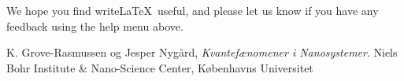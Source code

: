 \documentclass[a4paper]{article}
\begin{document}
We hope you find write\LaTeX\ useful, and please let us know if you have any feedback using the help menu above.


\begin{thebibliography}{9}
  K. Grove-Rasmussen og Jesper Nygård,
  \emph{Kvantefænomener i Nanosystemer}.
  Niels Bohr Institute \& Nano-Science Center, Københavns Universitet

\end{thebibliography}
\end{document}
